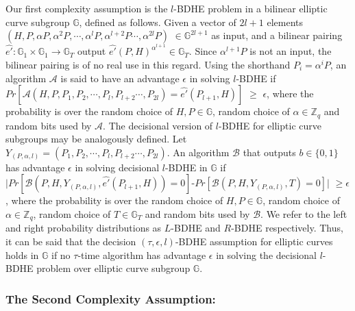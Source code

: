 Our first complexity assumption is the $l$-BDHE problem \cite{boneh2005collusion} in a bilinear elliptic curve subgroup $\mathbb{G}$, defined as follows. Given a vector of $2l+1$ elements $(H,P,\alpha P, {\alpha}^2P,\cdots,{\alpha}^{l}P,{\alpha}^{l+2}P\cdots,{\alpha}^{2l}P)$ $\in \mathbb{G}^{2l+1}$  as input, and a bilinear pairing $\hat{e'}:\mathbb{G}_1 \times \mathbb{G}_1\longrightarrow\mathbb{G}_T$ output $\hat{e'}(P,H)^{\alpha^{l+1}}\in\mathbb{G}_T$. Since ${\alpha}^{l+1}P$ is not an input, the bilinear pairing is of no real use in this regard. Using the shorthand $P_i = \alpha^{i}P$, an algorithm $\mathcal{A}$ is said to have an advantage $\epsilon$ in solving $l$-BDHE if $Pr[\mathcal{A}(H,P,P_1, P_2,\cdots,P_l,P_{l+2}\cdots,P_{2l}) =\hat{e'}(P_{l+1},H)]$ $\geq$ $\epsilon$, where the probability is over the random choice of $H,P \in \mathbb{G}$, random choice of $\alpha \in \mathbb{Z}_q$ and random bits used by $\mathcal{A}$. The decisional version of $l$-BDHE for elliptic curve subgroups may be analogously defined. Let $Y_{(P,\alpha,l)}=(P_1, P_2,\cdots,P_l,P_{l+2}\cdots,P_{2l})$. An algorithm $\mathcal{B}$ that outputs $b\in\{0,1\}$ has advantage $\epsilon$ in solving decisional $l$-BDHE in $\mathbb{G}$ if 
$|Pr[\mathcal{B}(P,H,Y_{(P,\alpha,l)},\hat{e'}(P_{l+1},H))=0]$-$Pr[\mathcal{B}(P,H,Y_{(P,\alpha,l)},T)=0]|$ $\geq \epsilon$,
where the probability is over the random choice of $H,P \in \mathbb{G}$, random choice of $\alpha \in \mathbb{Z}_q$, random choice of $T\in \mathbb{G}_T$ and random bits used by $\mathcal{B}$. We refer to the left and right probability distributions as $L$-BDHE and $R$-BDHE respectively. Thus, it can be said that the decision $(\tau,\epsilon,l)$-BDHE assumption for elliptic curves holds in $\mathbb{G}$ if no $\tau$-time algorithm has advantage $\epsilon$  in solving the decisional $l$-BDHE problem over elliptic curve subgroup $\mathbb{G}$. 

\subsubsection{The Second Complexity Assumption:} 
\label{subsubsec:asm_2}

